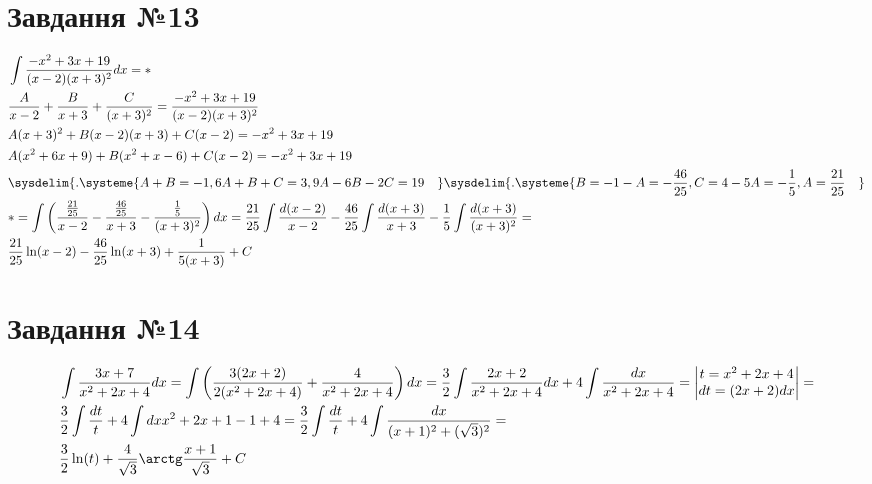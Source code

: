 \documentclass{report}
\begin{document}
\section{Завдання №13}
\begin{equation}\begin{split}
	& \int\frac{-x^2 + 3x + 19}{(x-2)(x+3)^2}dx = \ast\\
	& \frac{A}{x-2} + \frac{B}{x+3} + \frac{C}{(x + 3)^2} = \frac{-x^2 + 3x + 19}{(x-2)(x+3)^2}\\
	& A(x+3)^2 + B(x-2)(x+3) + C(x-2) = -x^2 + 3x + 19\\
	& A(x^2 + 6x + 9) + B(x^2 + x - 6) + C(x - 2) = -x^2 + 3x + 19\\
	& \sysdelim\{.\systeme{A + B = -1, 6A + B + C = 3, 9A - 6B - 2C = 19\quad} \sysdelim\{.\systeme{B = -1 - A = -\frac{46}{25}, C = 4 - 5A = -\frac{1}{5}, A = \frac{21}{25}\quad}\\
	& \ast = \int\left(\frac{\frac{21}{25}}{x-2} - \frac{\frac{46}{25}}{x+3} - \frac{\frac{1}{5}}{(x+3)^2}\right)dx = \frac{21}{25}\int\frac{d(x-2)}{x-2} - \frac{46}{25}\int\frac{d(x+3)}{x+3} - \frac{1}{5}\int\frac{d(x + 3)}{(x+3)^2} =\\
	& \frac{21}{25}\ln(x - 2) - \frac{46}{25}\ln(x + 3) + \frac{1}{5(x + 3)} + C
\end{split}\end{equation}

\section{Завдання №14}
\begin{equation}\begin{split}
	& \int\frac{3x + 7}{x^2 + 2x + 4}dx = \int\left(\frac{3(2x + 2)}{2(x^2 + 2x + 4)} + \frac{4}{x^2 + 2x + 4}\right)dx = \frac{3}{2}\int\frac{2x+2}{x^2 + 2x + 4}dx + 4\int\frac{dx}{x^2 + 2x + 4} = \begin{vmatrix}t = x^2 + 2x + 4\\dt = (2x + 2)dx\end{vmatrix} =\\
	& \frac{3}{2}\int\frac{dt}{t} + 4\int{dx}{x^2 + 2x + 1 - 1 + 4} = \frac{3}{2}\int\frac{dt}{t} + 4\int\frac{dx}{(x+1)^2 + (\sqrt{3})^2} =\\
	& \frac{3}{2}\ln(t) + \frac{4}{\sqrt{3}}\arctg\frac{x + 1}{\sqrt{3}} + C
\end{split}\end{equation}
\end{document}
